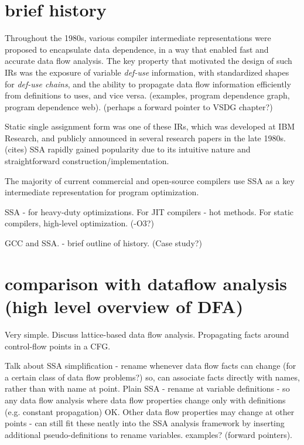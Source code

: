 
\section{brief history}




Throughout the 1980s, various compiler intermediate
representations were proposed to encapsulate data
dependence, in a way that enabled fast and accurate
data flow analysis.
The key property that motivated the design of
such IRs was the exposure of variable \textit{def-use} 
information, with standardized shapes for
\textit{def-use chains}, and the ability
to propagate data flow information efficiently
from definitions to uses,
and vice versa.
(examples, program dependence graph, program dependence web).
(perhaps a forward pointer to 
VSDG chapter?)


Static single assignment form was one of these IRs, 
which was developed at IBM Research, and publicly announced
in several research papers in the late 1980s. (cites)
SSA rapidly gained popularity due to its 
intuitive nature and straightforward
construction/implementation.

The majority of current commercial and open-source compilers
use SSA as a key intermediate representation for
program optimization.

SSA - for heavy-duty optimizations.
For JIT compilers - hot methods.
For static compilers, high-level optimization. (-O3?)

GCC and SSA. - brief outline of history. (Case study?)


\section{comparison with dataflow analysis (high level overview of DFA)}


Very simple. Discuss lattice-based data flow analysis.
Propagating facts around control-flow points in a CFG.

Talk about SSA simplification - rename whenever data flow
facts can change (for a certain class of data flow problems?)
so, can associate facts directly with names, rather than with
name at point.
Plain SSA - rename at variable definitions - so any data flow
analysis where data flow properties change only with definitions
(e.g. constant propagation) OK. Other data flow properties may 
change at other points - can still fit these neatly into the SSA
analysis framework by inserting additional pseudo-definitions
to rename variables. examples? (forward pointers).


